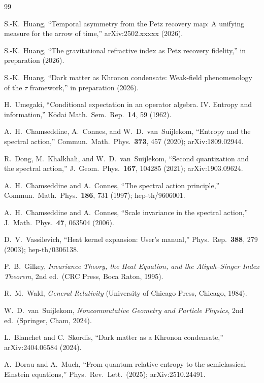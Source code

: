 \documentclass[prl,twocolumn,superscriptaddress,longbibliography]{revtex4-2}
\begin{document}
\begin{thebibliography}{99}

S.-K.~Huang,
``Temporal asymmetry from the Petz recovery map:
A unifying measure for the arrow of time,''
arXiv:2502.xxxxx (2026).

S.-K.~Huang,
``The gravitational refractive index as Petz
recovery fidelity,''
in preparation (2026).

S.-K.~Huang,
``Dark matter as Khronon condensate: Weak-field
phenomenology of the $\tau$ framework,''
in preparation (2026).

H.~Umegaki,
``Conditional expectation in an operator algebra.
IV. Entropy and information,''
K\=odai Math.\ Sem.\ Rep.\ \textbf{14}, 59 (1962).

A.~H.~Chamseddine, A.~Connes, and
W.~D.~van~Suijlekom,
``Entropy and the spectral action,''
Commun.\ Math.\ Phys.\ \textbf{373}, 457 (2020);
arXiv:1809.02944.

R.~Dong, M.~Khalkhali, and
W.~D.~van~Suijlekom,
``Second quantization and the spectral action,''
J.\ Geom.\ Phys.\ \textbf{167}, 104285 (2021);
arXiv:1903.09624.

A.~H.~Chamseddine and A.~Connes,
``The spectral action principle,''
Commun.\ Math.\ Phys.\ \textbf{186}, 731 (1997);
hep-th/9606001.

A.~H.~Chamseddine and A.~Connes,
``Scale invariance in the spectral action,''
J.\ Math.\ Phys.\ \textbf{47}, 063504 (2006).

D.~V.~Vassilevich,
``Heat kernel expansion: User's manual,''
Phys.\ Rep.\ \textbf{388}, 279 (2003);
hep-th/0306138.

P.~B.~Gilkey,
\emph{Invariance Theory, the Heat Equation, and
the Atiyah--Singer Index Theorem},
2nd ed.\ (CRC Press, Boca Raton, 1995).

R.~M.~Wald,
\emph{General Relativity}
(University of Chicago Press, Chicago, 1984).

W.~D.~van~Suijlekom,
\emph{Noncommutative Geometry and Particle Physics},
2nd ed.\ (Springer, Cham, 2024).

L.~Blanchet and C.~Skordis,
``Dark matter as a Khronon condensate,''
arXiv:2404.06584 (2024).

A.~Dorau and A.~Much,
``From quantum relative entropy to the
semiclassical Einstein equations,''
Phys.\ Rev.\ Lett.\ (2025);
arXiv:2510.24491.


\end{thebibliography}
\end{document}
